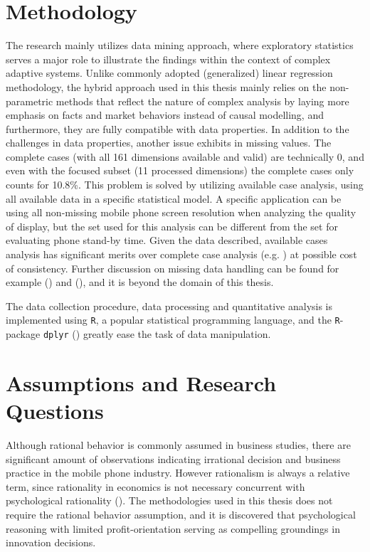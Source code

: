 \documentclass[utf8,english]{gradu3}
\begin{document}
\section{Methodology}

The research mainly utilizes data mining approach, where exploratory statistics serves a major role to illustrate the findings within the context of complex adaptive systems. Unlike commonly adopted (generalized) linear regression methodology, the hybrid approach used in this thesis mainly relies on the non-parametric methods that reflect the nature of complex analysis by laying more emphasis on facts and market behaviors instead of causal modelling, and furthermore, they are fully compatible with data properties. In addition to the challenges in data properties, another issue exhibits in missing values. The complete cases (with all 161 dimensions available and valid) are technically 0, and even with the focused subset (11 processed dimensions) the complete cases only counts for 10.8\%. This problem is solved by utilizing available case analysis, using all available data in a specific statistical model. A specific application can be using all non-missing mobile phone screen resolution when analyzing the quality of display, but the set used for this analysis can be different from the set for evaluating phone stand-by time. Given the data described, available cases analysis has significant merits over complete case analysis (e.g. \cite{kim1977treatment}) at possible cost of consistency. Further discussion on missing data handling can be found for example \citeauthor{little2014statistical} (\citeyear{little2014statistical}) and \citeauthor{pigott2001review} (\citeyear{pigott2001review}), and it is beyond the domain of this thesis.

The data collection procedure, data processing and quantitative analysis is implemented using \texttt{R}, a popular statistical programming language, and the \texttt{R}-package \texttt{dplyr} (\cite{dplyr}) greatly ease the task of data manipulation.

\section{Assumptions and Research Questions}

Although rational behavior is commonly assumed in business studies, there are significant amount of observations indicating irrational decision and business practice in the mobile phone industry. However rationalism is always a relative term, since rationality in economics is not necessary concurrent with psychological rationality (\cite{hogarth1987rational}). The methodologies used in this thesis does not require the rational behavior assumption, and it is discovered that psychological reasoning with limited profit-orientation serving as compelling groundings in innovation decisions.
\end{document}
